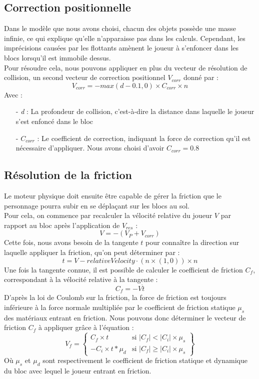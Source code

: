 \documentclass[10pt]{report}
\begin{document}
\subsection{Correction positionnelle}
Dans le modèle que nous avons choisi, chacun des objets possède une masse infinie,
ce qui explique qu'elle n'apparaisse pas dans les calculs.
Cependant, les imprécisions causées par les flottants amènent le joueur à s'enfoncer dans les blocs
lorsqu'il est immobile dessus.\\
Pour résoudre cela, nous pouvons appliquer en plus du vecteur de résolution de collision,
un second vecteur de correction positionnel \(V_{corr}\) donné par :
\[V_{corr} = -max(d-0.1,0) \times C_{corr} \times n\]
Avec :\\
\begin{itemize}
  \item[-] \emph{d} : La profondeur de collision, c'est-à-dire la distance dans laquelle
  le joueur s'est enfoncé dans le bloc
  \item[-] \(C_{corr}\) : Le coefficient de correction, indiquant la force de correction
  qu'il est nécessaire d'appliquer.
  Nous avons choisi d'avoir \(C_{corr}=0.8\)
\end{itemize}

\subsection{Résolution de la friction} \label{physique:friction}
Le moteur physique doit ensuite être capable de gérer la friction que le personnage pourra subir en
se déplaçant sur les blocs au sol.\\
Pour cela, on commence par recalculer la vélocité relative du joueur \(V\) par rapport au bloc après
l'application de \(V_{res}\) :
\[V =  - (V_{P} + V_{corr})\]
Cette fois, nous avons besoin de la tangente \(t\) pour connaître la direction sur laquelle appliquer la friction,
qu'on peut déterminer par :
\[t = V - relativeVelocity \cdot (n \times (1,0)) \times n\]
Une fois la tangente connue, il est possible de calculer le coefficient de friction \(C_{f}\),
correspondant à la vélocité relative à la tangente :
\[C_{f} = - V \dot t\]
D'après la loi de Coulomb sur la friction, la force de friction est toujours inférieure à la force normale
multipliée par le coefficient de friction statique \(\mu_{s}\) des matériaux entrant en friction.
Nous pouvons donc déterminer le vecteur de friction \(C_{f}\) à appliquer grâce à l'équation :
\[
V_{f} = \left\{\begin{array}{lr}
           C_{f} \times t & \text{si } |C_{f}| < |C_{i}| \times \mu_{s}\\
          -C_{i} \times t * \mu_{d} & \text{si } |C_{f}| \geq |C_{i}| \times \mu_{s}
        \end{array}\right\}
\]
Où \(\mu_{s}\) et \(\mu_{d}\) sont respectivement le coefficient de friction statique et dynamique du bloc avec lequel
le joueur entrant en friction.
\end{document}
